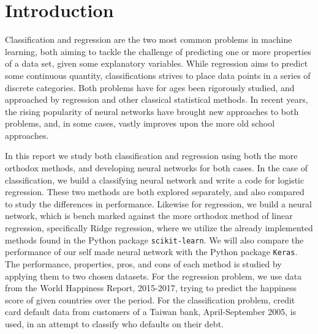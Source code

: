 \documentclass[10pt, twocolumn]{article}
\begin{document}
\vfill

\pagebreak

\restoregeometry

\onecolumn
\tableofcontents
\twocolumn
\pagebreak

\section{Introduction}
Classification and regression are the two most common problems in machine learning, both aiming to tackle the challenge of predicting one or more properties of a data set, given some explanatory variables. While regression aims to predict some continuous quantity, classifications strives to place data points in a series of discrete categories. Both problems have for ages been rigorously studied, and approached by regression and other classical statistical methods. In recent years, the rising popularity of neural networks have brought new approaches to both problems, and, in some cases, vastly improves upon the more old school approaches.

In this report we study both classification and regression using both the more orthodox methods, and developing neural networks for both cases. In the case of classification, we build a classifying neural network and write a code for logistic regression. These two methods are both explored separately, and also compared to study the differences in performance. Likewise for regression, we build a neural network, which is bench marked against the more orthodox method of linear regression, specifically Ridge regression, where we utilize the already implemented methods found in the Python package \texttt{scikit-learn}. We will also compare the performance of our self made neural network with the Python package \texttt{Keras}. The performance, properties, pros, and cons of each method is studied by applying them to two chosen datasets. For the regression problem, we use data from the World Happiness Report, 2015-2017, trying to predict the happiness score of given countries over the period. For the classification problem, credit card default data from customers of a Taiwan bank, April-September 2005, is used, in an attempt to classify who defaults on their debt.
\end{document}
